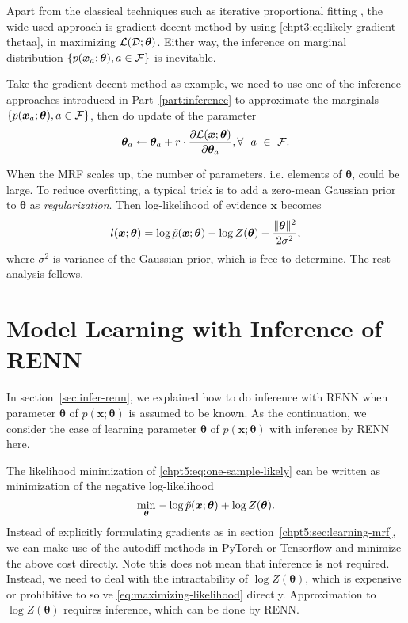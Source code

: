 Apart from the classical techniques such as iterative proportional fitting \cite{eric10-708ipf}, the wide used approach is gradient decent method by using \eqref{chpt3:eq:likely-gradient-thetaa}, in maximizing $\mathcal{L}(\mathcal{D}; \bm{\theta})$. Either way, the inference on marginal distribution $\left\{ p(\bm{x}_a; \bm{\theta}), a \in \mathcal{F} \right\}$ is inevitable.

Take the gradient decent method as example, we need to use one of the inference approaches introduced in Part~\ref{part:inference} to approximate the marginals $\left\{ p(\bm{x}_a; \bm{\theta}), a \in \mathcal{F} \right\}$, then do update of the parameter
\begin{equation}
  \bm{\theta}_a \leftarrow \bm{\theta}_a + r \cdot \frac{ \partial \mathcal{L}(\bm{x};\bm{\theta})}{\partial \bm{\theta}_a}, \forall~~a~\in~\mathcal{F}.
\end{equation}

\begin{remark}
  When the MRF scales up, the number of parameters, i.e. elements of $\bm{\theta}$, could be large. To reduce overfitting, a typical trick is to add a zero-mean Gaussian prior to $\bm{\theta}$ as \textit{regularization}. Then log-likelihood of evidence $\bm{x}$ becomes 
  \begin{equation}
    l(\bm{x};\bm{\theta}) = \log{\tilde{p}(\bm{x}; \bm{\theta})} - \log{Z(\bm{\theta})} - \frac{\| \bm{\theta} \|^2}{2\sigma^2},
  \end{equation}
  where $\sigma^2$ is variance of the Gaussian prior, which is free to determine. The rest analysis fellows.
\end{remark}


\section{Model Learning with Inference of RENN}
\label{sec:model-learning-with-renn}
In section~\ref{sec:infer-renn}, we explained how to do inference with RENN when parameter $\bm{\theta}$ of $p(\bm{x}; \bm{\theta})$ is assumed to be known. As the continuation, we consider the case of learning parameter $\bm{\theta}$ of $p(\bm{x}; \bm{\theta})$ with inference by RENN here.

The likelihood minimization of \eqref{chpt5:eq:one-sample-likely} can be written as minimization of the negative log-likelihood
\begin{equation}\label{eq:maximizing-likelihood}
  \underset{\bm{\theta}}{\min}\;{ -\log{\tilde{p}(\bm{x}; \bm{\theta})} + \log{Z(\bm{\theta})}}.
\end{equation}
Instead of explicitly formulating gradients as in section~\ref{chpt5:sec:learning-mrf}, we can make use of the autodiff methods in PyTorch or Tensorflow and minimize the above cost directly. Note this does not mean that inference is not required. Instead, we need to deal with the intractability of $\log{Z(\bm{\theta})}$, which is expensive or prohibitive to solve \eqref{eq:maximizing-likelihood} directly. Approximation to $\log{Z(\bm{\theta})}$ requires inference, which can be done by RENN. 

